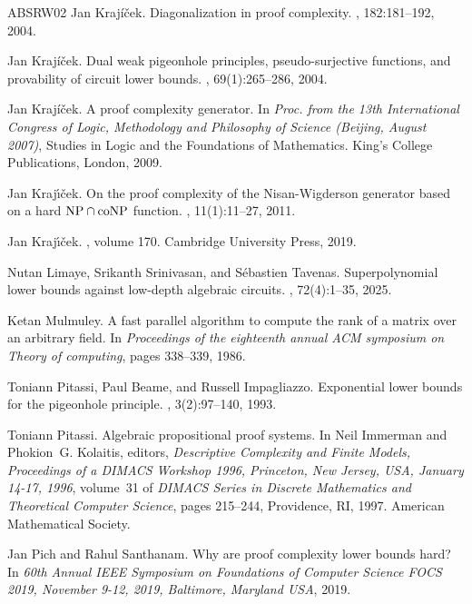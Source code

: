 \documentclass[11pt,letter]{article}
\theoremstyle{remark} %
\begin{document}
{\begin{thebibliography}{ABSRW02}
Jan Kraj\'{i}\v{c}ek.
\newblock Diagonalization in proof complexity.
, 182:181--192, 2004.

Jan Kraj\'{i}\v{c}ek.
\newblock Dual weak pigeonhole principles, pseudo-surjective functions, and provability of circuit lower bounds.
, 69(1):265--286, 2004.

Jan Kraj\'{i}\v{c}ek.
\newblock A proof complexity generator.
\newblock In {\em Proc. from the 13th International Congress of Logic, Methodology and Philosophy of Science (Beijing, August 2007)}, Studies in Logic and the Foundations of Mathematics. King's College Publications, London, 2009.

Jan Kraj{\'{\i}}{\v{c}}ek.
\newblock On the proof complexity of the {N}isan-{W}igderson generator based on a hard {${\rm NP}\cap{\rm coNP}$} function.
, 11(1):11--27, 2011.

Jan Kraj{\'\i}{\v{c}}ek.
, volume 170.
\newblock Cambridge University Press, 2019.

Nutan Limaye, Srikanth Srinivasan, and S{\'e}bastien Tavenas.
\newblock Superpolynomial lower bounds against low-depth algebraic circuits.
, 72(4):1--35, 2025.

Ketan Mulmuley.
\newblock A fast parallel algorithm to compute the rank of a matrix over an arbitrary field.
\newblock In {\em Proceedings of the eighteenth annual ACM symposium on Theory of computing}, pages 338--339, 1986.

Toniann Pitassi, Paul Beame, and Russell Impagliazzo.
\newblock Exponential lower bounds for the pigeonhole principle.
, 3(2):97--140, 1993.

Toniann Pitassi.
\newblock Algebraic propositional proof systems.
\newblock In Neil Immerman and Phokion~G. Kolaitis, editors, {\em Descriptive Complexity and Finite Models, Proceedings of a {DIMACS} Workshop 1996, Princeton, New Jersey, USA, January 14-17, 1996}, volume~31 of {\em {DIMACS} Series in Discrete Mathematics and Theoretical Computer Science}, pages 215--244, Providence, RI, 1997. {American Mathematical Society}.

Jan Pich and Rahul Santhanam.
\newblock Why are proof complexity lower bounds hard?
\newblock In {\em 60th Annual IEEE Symposium on Foundations of Computer Science {FOCS} 2019, November 9-12, 2019, Baltimore, Maryland {USA}}, 2019.


\end{thebibliography}}
\end{document}
